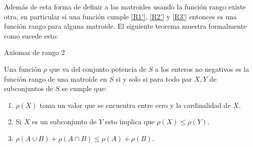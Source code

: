 Además de esta forma de definir a las matroides usando la función rango existe otra, en particular si una función cumple \ref{R1'}, \ref{R2'} y \ref{R3'} entonces es una función rango para alguna matroide. El siguiente teorema muestra formalmente como sucede esto:

\begin{teo}{Axiomas de rango 2}

Una función $\rho$ que va del conjunto potencia de $S$ a los enteros no negativos es la función rango de una matroide en $S$ si y solo si para todo par $X,Y$ de subconjuntos de $S$ se cumple que: 
\begin{enumerate}
\item $\rho(X)$ toma un valor que se encuentra entre cero y la cardinalidad de $X$. 
\item Si $X$ es un subconjunto de $Y$ esto implica que $\rho(X) \leq \rho(Y)$.
\item $\rho(A \cup B)+ \rho(A \cap B) \leq \rho(A) + \rho(B).$
\end{enumerate}
\end{teo}

